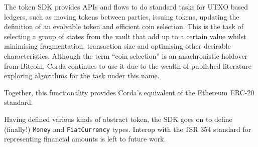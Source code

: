 \documentclass{article}
\begin{document}
The token SDK provides APIs and flows to do standard tasks for UTXO based ledgers, such as moving tokens between
parties, issuing tokens, updating the definition of an evolvable token and efficient coin selection. This is the
task of selecting a group of states from the vault that add up to a certain value whilst minimising fragmentation,
transaction size and optimising other desirable characteristics. Although the term ``coin selection'' is an
anachronistic holdover from Bitcoin, Corda continues to use it due to the wealth of published literature exploring
algorithms for the task under this name.

Together, this functionality provides Corda's equivalent of the Ethereum ERC-20 standard\cite{ERC20}.

Having defined various kinds of abstract token, the SDK goes on to define (finally!) \texttt{Money} and
\texttt{FiatCurrency} types. Interop with the JSR 354 standard for representing financial amounts is left to future
work.
\end{document}
